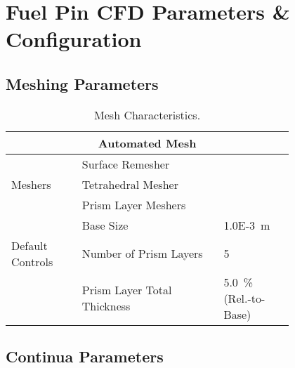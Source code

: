 \documentclass[8pt,a5paper]{article}
\begin{document}
\small


\centering

\section*{Fuel Pin CFD Parameters \& Configuration}

\raggedright

\subsection*{Meshing Parameters}

\vspace{-0.25in}

\begin{table}[h!]
    \label{table: Table 1}
    \centering
    \small
    \caption{Mesh Characteristics.}
    \begin{tabular}{|m{0.2\linewidth}|m{0.4\linewidth}|m{0.2\linewidth}|}
    \hline
    \multicolumn{3}{|c|}{\textbf{Automated Mesh}}\\\hline
    & \multicolumn{2}{l|}{Surface Remesher}\\\cline{2-3}
    Meshers & \multicolumn{2}{l|}{Tetrahedral Mesher}\\\cline{2-3}
    & \multicolumn{2}{l|}{Prism Layer Meshers}\\\hline
    & Base Size & \SI{1.0E-3}{m}\\\cline{2-3}
    Default Controls & Number of Prism Layers & \SI{5}{}\\\cline{2-3}
    & Prism Layer Total Thickness & \SI{5.0}{\%} (Rel.-to-Base)\\\hline
    \end{tabular}
\end{table}

\subsection*{Continua Parameters}

\vspace{-0.25in}
\end{document}
